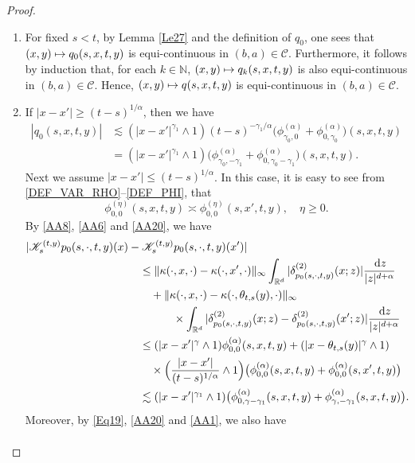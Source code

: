 \documentclass[JEP,XML,SOM,Unicode,published]{cedram}
\def\mto{\mathchoice{\longmapsto}{\mapsto}{\mapsto}{\mapsto}}
\theoremstyle{plain}
\theoremstyle{definition}
\newcommand\mN{\mathbb{N}}
\newcommand\mR{\mathbb{R}}
\newcommand\1{{\mathbf{1}}}
\newcommand\sC{{\mathscr C}}
\newcommand\sK{{\mathscr K}}
\newcommand{\dif}{\,\mathrm{d}}
\begin{document}
\begin{proof}
\begin{enumerate}
\item
For fixed $s<t$, by Lemma \ref{Le27} and the definition of $q_0$, one sees that $(x,y)\mto q_0(s,x,t,y)$ is equi-continuous in $(b,a)\in\sC$.
Furthermore, it follows by induction that, for each $k\in\mN$,
$(x,y)\mto q_k(s,x,t,y)$ is also equi-continuous in $(b,a)\in\sC$. Hence,
$(x,y)\mto q(s,x,t,y)$ is equi-continuous in $(b,a)\in\sC$.

\item
If $|x-x'|\geq (t-s)^{1/\alpha}$, then we have
\begin{align*}
|q_0(s,x,t,y)|&\lesssim (|x-x'|^{\gamma_1}\wedge 1)(t-s)^{-\gamma_1/\alpha}\bigl(\phi^{(\alpha)}_{\gamma_0,0}+\phi^{(\alpha)}_{0,\gamma_0}\bigr)(s,x,t,y)
\\&=(|x-x'|^{\gamma_1}\wedge 1)\bigl(\phi^{(\alpha)}_{\gamma_0,-\gamma_1}+\phi^{(\alpha)}_{0,\gamma_0-\gamma_1}\bigr)(s,x,t,y).
\end{align*}
Next we assume $|x-x'|\leq (t-s)^{1/\alpha}$. In this case, it is easy to see from \eqref{DEF_VAR_RHO}--\eqref{DEF_PHI}, that
\begin{equation}\label{AA20}
\phi^{(\eta)}_{0,0}(s,x,t,y)\asymp\phi^{(\eta)}_{0,0}(s,x',t,y),\quad \eta\geq 0.
\end{equation}
By \eqref{AA8}, \eqref{AA6} and \eqref{AA20}, we have
\begin{align*}
|\sK^{(t,y)}_{s}p_0(s,\cdot,t,y)(x)&-\sK^{(t,y)}_{s}p_0(s,\cdot,t,y)(x')|
\\&\quad\leq \|\kappa(\cdot,x,\cdot)-\kappa(\cdot,x',\cdot)\|_\infty \int_{\mR^d}|\delta^{(2)}_{p_0(s,\cdot,t,y)}(x;z)|\frac{\dif z}{|z|^{d+\alpha}}
\\&\qquad+\|\kappa(\cdot,x,\cdot)-\kappa(\cdot,\theta_{t,s}(y),\cdot)\|_\infty
\\&\qquad\qquad\times\int_{\mR^d}|\delta^{(2)}_{p_0(s,\cdot,t,y)}(x;z)-\delta^{(2)}_{p_0(s,\cdot,t,y)}(x';z)|\frac{\dif z}{|z|^{d+\alpha}}
\\&\quad\leq (|x-x'|^{\gamma}\wedge 1)\phi^{(\alpha)}_{0,0}(s,x,t,y)+(|x-\theta_{t,s}(y)|^\gamma\wedge 1)
\\&\qquad\times\Bigl(\frac{|x-x'|}{(t-s)^{1/\alpha}}\wedge 1\Bigr)\bigl(\phi^{(\alpha)}_{0,0}(s,x,t,y)+\phi^{(\alpha)}_{0,0}(s,x',t,y)\bigr)
\\&\quad\lesssim (|x-x'|^{\gamma_1}\wedge 1)\bigl(\phi^{(\alpha)}_{0,\gamma-\gamma_1}(s,x,t,y)+\phi^{(\alpha)}_{\gamma,-\gamma_1}(s,x,t,y)\bigr){.}
\end{align*}
Moreover, by \eqref{Eq19}, \eqref{AA20} and \eqref{AA1}, we also have
\begin{align*}

\end{align*}
\end{enumerate}
\end{proof}
\end{document}
